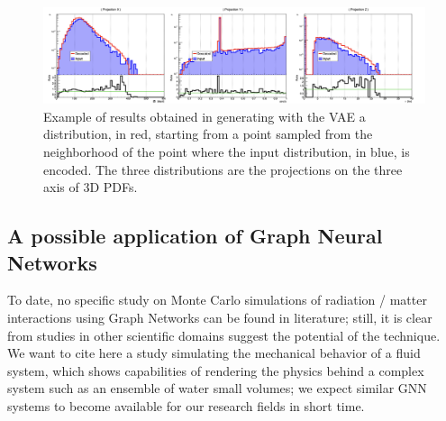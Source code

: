 \begin{figure}[!bht]
\centering
\includegraphics [width=\textwidth]{images/generated}
\caption{Example of results obtained in generating with the VAE a distribution, in red, starting from a point sampled from the neighborhood of the point where the input distribution, in blue, is encoded. The three distributions are the projections on the three axis of 3D PDFs.}
\label{fig:out}
\end{figure}



\subsection{A possible application of Graph Neural Networks}
To date, no specific study on Monte Carlo simulations of radiation / matter interactions using Graph Networks can be found in literature; still, it is clear from studies in other scientific domains suggest the potential of the technique. 
We want to cite here a study simulating the mechanical behavior of a fluid system, which shows capabilities of rendering the physics behind a complex system such as an ensemble of water small volumes\cite{acqua}; we expect similar GNN systems to become available for our research fields in short time.
